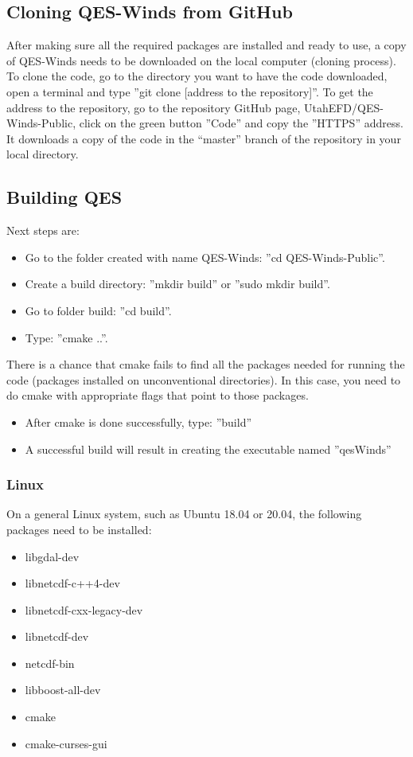 \subsection{Cloning QES-Winds from GitHub}

After making sure all the required packages are installed and ready to use, a copy of QES-Winds needs to be downloaded on the local computer (cloning process). To clone the code, go to the directory you want to have the code downloaded, open a terminal and type ''git clone [address to the repository]''. To get the address to the repository, go to the repository GitHub page, UtahEFD/QES-Winds-Public, click on the green button ''Code'' and copy the ''HTTPS'' address. It downloads a copy of the code in the “master” branch of the repository in your local directory.

\subsection{Building QES}

Next steps are:
\begin{itemize}
    \item Go to the folder created with name QES-Winds: ''cd QES-Winds-Public''.
    \item Create a build directory: ''mkdir build'' or ''sudo mkdir build''.
    \item Go to folder build: ''cd build''.
    \item Type: ''cmake ..''.
\end{itemize}

There is a chance that cmake fails to find all the packages needed for running the code (packages installed on unconventional directories). In this case, you need to do cmake with appropriate flags that point to those packages.

\begin{itemize}
    \item After cmake is done successfully, type: ''build''
    \item A successful build will result in creating the executable named ''qesWinds''
\end{itemize}

\subsubsection{Linux}
On a general Linux system, such as Ubuntu 18.04 or 20.04, the following packages need to be installed:
\begin{itemize}
\item libgdal-dev
\item libnetcdf-c++4-dev
\item libnetcdf-cxx-legacy-dev
\item libnetcdf-dev
\item netcdf-bin
\item libboost-all-dev
\item cmake
\item cmake-curses-gui
\end{itemize}


